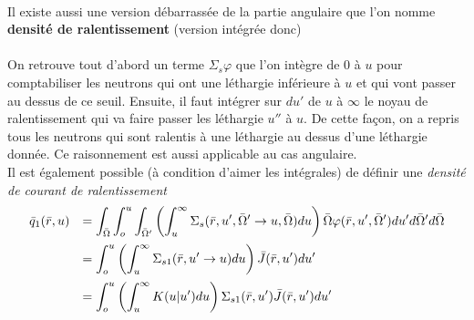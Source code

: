	\ \\
	
	Il existe aussi une version débarrassée de la partie angulaire que l'on nomme \textbf{densité 
	de ralentissement} (version intégrée donc)\ \\
	
	\ \\
	
	On retrouve tout d'abord un terme $\Sigma_s\varphi$ que l'on intègre de 0 à $u$ pour comptabiliser
	les neutrons qui ont une léthargie inférieure à $u$ et qui vont passer au dessus de ce seuil. 
	Ensuite, il faut intégrer sur $du'$ de $u$ à $\infty$ le noyau de ralentissement qui va faire 
	passer les léthargie $u''$ à $u$. De cette façon, on a repris tous les neutrons qui sont ralentis 
	à une léthargie au dessus d'une léthargie donnée. Ce raisonnement est aussi applicable au cas
	angulaire.\\
	
	Il est également possible (à condition d'aimer les intégrales) de définir une \textit{densité de
	courant de ralentissement}
	\begin{equation}
	\begin{array}{ll}
	{\bar q_1}(\bar r,u) &\DS= \int_{\bar \Omega }^{}    \int_o^u    \int_{\bar \Omega '}^{}    \left( 
	\int_u^\infty    {\Sigma _s}(\bar r,u',\bar \Omega ' \to u,\bar \Omega )du  \right)\bar \Omega
	\varphi (\bar r,u',\bar \Omega ')du'd\bar \Omega 'd\bar \Omega\vspace{2mm}\\
	 &\DS = \int_o^u    \left( \int_u^\infty     {\Sigma _{s1}}(\bar r,u' \to u)du  \right)\bar 
	 J(\bar r,u')du'\vspace{2mm}\\
	&\DS= \int_o^u    \left(   \int_u^\infty     K(u|u')du   \right){\Sigma _{s1}}(\bar r,u')\bar
	J(\bar r,u')du'
	\end{array}
	\end{equation}\ \\
	
